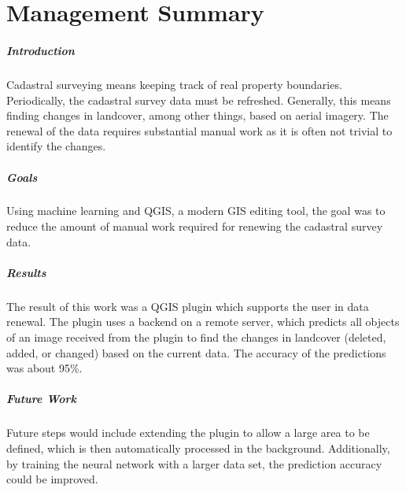 
\chapter*{Management Summary}

\paragraph*{Introduction}
Cadastral surveying means keeping track of real property boundaries. Periodically, the cadastral survey data must be refreshed. Generally, this means finding changes in landcover, among other things, based on aerial imagery. The renewal of the data requires substantial manual work as it is often not trivial to identify the changes.

\paragraph*{Goals}
Using machine learning and QGIS, a modern GIS editing tool, the goal was to reduce the amount of manual work required for renewing the cadastral survey data.

\paragraph*{Results}
The result of this work was a QGIS plugin which supports the user in data renewal. The plugin uses a backend on a remote server, which predicts all objects of an image received from the plugin to find the changes in landcover (deleted, added, or changed) based on the current data. The accuracy of the predictions was about 95\%.

\paragraph*{Future Work}
Future steps would include extending the plugin to allow a large area to be defined, which is then automatically processed in the background. Additionally, by training the neural network with a larger data set, the prediction accuracy could be improved.